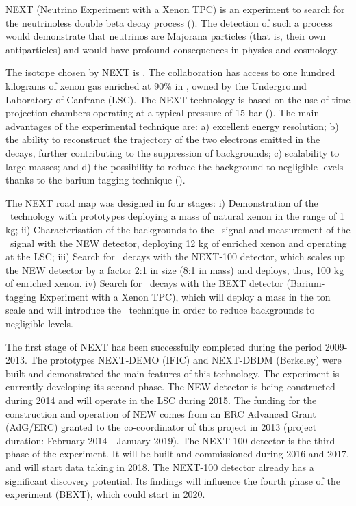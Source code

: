 
NEXT (Neutrino Experiment with a Xenon TPC) is an experiment to search for the neutrinoless double beta decay process (\bbonu). The detection of such a process would demonstrate that neutrinos are Majorana particles (that is, their own antiparticles) and would have profound consequences in physics and cosmology.  

The isotope chosen by NEXT is  \XE. The collaboration has access to one hundred kilograms of xenon gas enriched at 90\% in \XE, owned by the Underground Laboratory of Canfranc (LSC). The NEXT technology is based on the use of time projection chambers operating at a typical pressure of 15 bar (\HPXE). The main advantages of the experimental technique are: a) excellent energy resolution; b) the ability to reconstruct the trajectory of the two electrons emitted in the decays, further contributing to the suppression of backgrounds; c) scalability to large masses; and d) the possibility to reduce the background to negligible levels thanks to the barium tagging technique (\BATA).

The NEXT road map was designed in four stages: i) Demonstration of the \HPXE\ technology with prototypes deploying a mass of natural xenon in the range of 1 kg; ii) Characterisation of the backgrounds to the \bbonu\ signal and measurement of the \bbtnu\ signal with the NEW detector, deploying 12 kg of enriched xenon and operating at the LSC; iii) Search for \bbonu\ decays with the NEXT-100 detector, which scales up the NEW detector by a factor 2:1 in size (8:1 in mass) and deploys, thus, 100 kg of enriched xenon. iv) Search for \bbonu\ decays with the BEXT detector (Barium-tagging Experiment with a Xenon TPC), which will deploy a mass in the ton scale and will introduce the \BATA\ technique in order to reduce backgrounds to negligible levels.  

The first stage of NEXT has been successfully completed during the period 2009-2013. The prototypes NEXT-DEMO (IFIC) and NEXT-DBDM (Berkeley) were built and demonstrated the main features of this technology. The experiment is currently developing its second phase. The NEW detector is being constructed during 2014 and will operate in the LSC during 2015. The funding for the construction and operation of NEW comes from an ERC Advanced Grant (AdG/ERC) granted to the co-coordinator of this project in 2013 (project duration: February 2014 - January 2019). The NEXT-100 detector is the third phase of the experiment. It will be built and commissioned during 2016 and 2017, and will start data taking in 2018. The NEXT-100 detector already has a significant discovery potential. Its findings will influence the fourth phase of the experiment (BEXT), which could start in 2020. 


